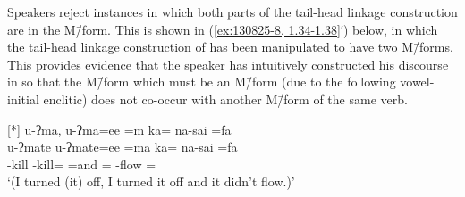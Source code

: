 \begin{exe}
	\label{ex:130825-8, 1.34-1.38}
	\begin{xlist}
	\end{xlist}
\end{exe}

Speakers reject instances in which both parts of the
tail-head linkage construction are in the M\=/form.
This is shown in (\ref{ex:130825-8, 1.34-1.38}′) below,
in which the tail-head linkage construction of 
has been manipulated to have two M\=/forms.
This provides evidence that the speaker has intuitively
constructed his discourse in 
so that the M\=/form which must be an M\=/form (due to
the following vowel-initial enclitic) does not
co-occur with another M\=/form of the same verb.

\begin{exe}
	{\glll	
								u-ʔma, u-ʔma=ee =m ka= na-sai =fa \\
								u-ʔmate u-ʔmate=ee =ma ka= na-sai =fa\\
								{\qu}-kill{\tbrM} {\qu}-kill{\tbrMv}={\eeV} =and {\ka}= \na-flow ={\fa}\\
				\glt	`(I turned (it) off, I turned it off and it didn't flow.)' }
\end{exe}


